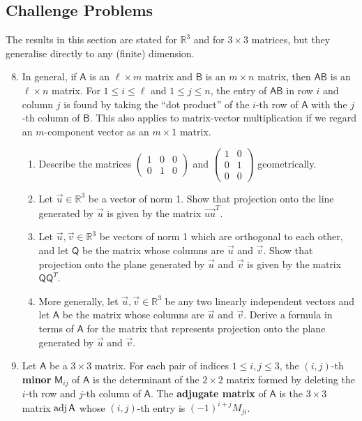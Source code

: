 \newpage
\subsection{Challenge Problems}

The results in this section are stated for $\mathbb{R}^3$ and for $3\times 3$ matrices, but they generalise directly to any (finite) dimension.

\begin{enumerate}\setcounter{enumi}{7}
\item In general, if $\mathsf{A}$ is an $\ell\times m$ matrix and $\mathsf{B}$ is an $m\times n$ matrix, then $\mathsf{AB}$ is an $\ell\times n$ matrix. For $1\leq i\leq\ell$ and $1\leq j\leq n$, the entry of $\mathsf{AB}$ in row $i$ and column $j$ is found by taking the ``dot product'' of the $i$-th row of $\mathsf{A}$ with the $j$-th column of $\mathsf{B}$. This also applies to matrix-vector multiplication if we regard an $m$-component vector as an $m\times 1$ matrix.
\begin{enumerate}
\item Describe the matrices $\begin{pmatrix} 1 & 0 & 0 \\ 0 & 1 & 0 \end{pmatrix}$ and $\begin{pmatrix} 1 & 0 \\ 0 & 1 \\ 0 & 0 \end{pmatrix}$ geometrically.
\item Let $\vec{u}\in\mathbb{R}^3$ be a vector of norm 1. Show that projection onto the line generated by $\vec{u}$ is given by the matrix $\vec{uu}^T$.
\item Let $\vec{u},\vec{v}\in\mathbb{R}^3$ be vectors of norm 1 which are orthogonal to each other, and let $\mathsf{Q}$ be the matrix whose columns are $\vec{u}$ and $\vec{v}$. Show that projection onto the plane generated by $\vec{u}$ and $\vec{v}$ is given by the matrix $\mathsf{QQ}^T$.
\item More generally, let $\vec{u},\vec{v}\in\mathbb{R}^3$ be any two linearly independent vectors and let $\mathsf{A}$ be the matrix whose columns are $\vec{u}$ and $\vec{v}$. Derive a formula in terms of $\mathsf{A}$ for the matrix that represents projection onto the plane generated by $\vec{u}$ and $\vec{v}$.
\end{enumerate}
\item Let $\mathsf{A}$ be a $3\times 3$ matrix. For each pair of indices $1\leq i,j\leq 3$, the $(i,j)$-th \textbf{minor} $\mathsf{M}_{ij}$ of $\mathsf{A}$ is the determinant of the $2\times 2$ matrix formed by deleting the $i$-th row and $j$-th column of $\mathsf{A}$. The \textbf{adjugate matrix} of $\mathsf{A}$ is the $3\times 3$ matrix $\operatorname{adj}\mathsf{A}$ whose $(i,j)$-th entry is $(-1)^{i + j}M_{ji}$.

\end{enumerate}

